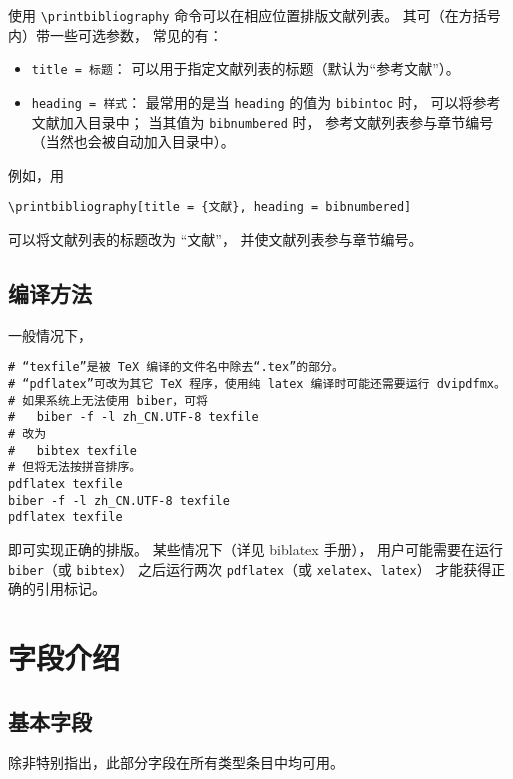 \documentclass[UTF8, fancyhdr, hyperref]{ctexart}
\begin{document}
使用 \verb|\printbibliography| 命令可以在相应位置排版文献列表。
其可（在方括号内）带一些可选参数\supercite{biblatex}，
常见的有：
\begin{itemize}
	\item \verb|title = 标题|：
		可以用于指定文献列表的标题（默认为“参考文献”）。
	\item \verb|heading = 样式|：
		最常用的是当 \verb|heading| 的值为 \verb|bibintoc| 时，
		可以将参考文献加入目录中；
		当其值为 \verb|bibnumbered| 时，
		参考文献列表参与章节编号（当然也会被自动加入目录中）。
\end{itemize}

例如，用
\begin{Verbatim}[frame = single]
\printbibliography[title = {文献}, heading = bibnumbered]
\end{Verbatim}
可以将文献列表的标题改为 “文献”，
并使文献列表参与章节编号。

\subsection{编译方法}

一般情况下，
\begin{Verbatim}[frame = single]
# “texfile”是被 TeX 编译的文件名中除去“.tex”的部分。
# “pdflatex”可改为其它 TeX 程序，使用纯 latex 编译时可能还需要运行 dvipdfmx。
# 如果系统上无法使用 biber，可将
#   biber -f -l zh_CN.UTF-8 texfile
# 改为
#   bibtex texfile
# 但将无法按拼音排序。
pdflatex texfile
biber -f -l zh_CN.UTF-8 texfile
pdflatex texfile
\end{Verbatim}
即可实现正确的排版。
某些情况下（详见 biblatex 手册\supercite{biblatex}），
用户可能需要在运行 \verb|biber|（或 \verb|bibtex|）
之后运行两次 \verb|pdflatex|（或 \verb|xelatex|、\verb|latex|）
才能获得正确的引用标记。

\section{字段介绍}\label{sec:fields}
\subsection{基本字段}

除非特别指出，此部分字段在所有类型条目中均可用。
\end{document}
